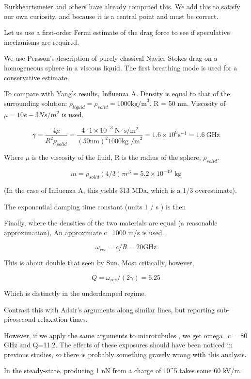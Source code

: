 \documentclass[paper.tex]{subfiles}
\begin{document}
\begin{autem}
	Burkheartsmeier and others have already computed this. We add this to satisfy our own curiosity, and because it is a central point and must be correct.
\end{autem}


Let us use a first-order Fermi estimate of the drag force to see if speculative mechanisms are required.

We use Persson's description of purely classical Navier-Stokes drag \cite{nature1986} on a homogeneous sphere in a viscous liquid. The first breathing mode is used for a conservative estimate.

To compare with Yang's results, Influenza A. Density is equal to that of the surrounding solution: $\rho_{liquid} = \rho_{solid} = 1000 \text{kg/m}^3$. R = 50 nm. Viscosity of $\mu=10e-3 Ns/m^2$ is used.

$$ \gamma = \frac{4\mu}{R^2 \rho_{solid}} = \frac{4 \cdot 1\times 10^{-3}\  \text{N}\cdot \text{s} / \text{m}^2 }{(50 \text{nm})^2 1000 \text{kg /m}^2} = 1.6 \times 10^9 \text{s}^{-1} = 1.6\ \text{GHz}$$

Where $\mu$ is the viscosity of the fluid, R is the radius of the sphere, $\rho_{solid}$. \footnotemark \footnotemark



$$m = \rho_{solid}  (4/3) \pi r^3 = 5.2 \times 10^{-19} \text{ kg} $$

(In the case of Influenza A, this yields 313 MDa, which is a 1/3 overestimate). 

The exponential damping time constant (units 1 / s ) is then

Finally, where the densities of the two materials are equal (a reasonable approximation), An approximate c=1000 m/s is used. 

$$ \omega_{res} = c / R = 20 \text{GHz}$$

This is about double that seen by Sun. Most critically, however,

$$ Q = \omega_{res}/(2\gamma) = 6.25 $$

Which is distinctly in the underdamped regime.

Contrast this with Adair's arguments along similar lines, but reporting sub-picosecond relaxation times.

However, if we apply the same arguments to microtubules \cite{Viscous2000}, we get omega_c = 80 GHz and Q=11.2. The effects of these exposures should have been noticed in previous studies, so there is probably something gravely wrong with this analysis.


In the steady-state, producing 1 nN from a charge of 10^5 takes some 60 kV/m. 
\end{document}
